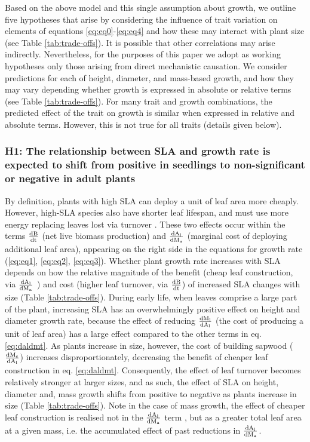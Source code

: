 \documentclass[a4paper,11pt]{article}
\begin{document}
Based on the above model and this single assumption about growth, we outline five hypotheses that arise by considering the influence of trait variation on elements of equations  \ref{eq:eq0}-\ref{eq:eq4} and how these may interact with plant size (see Table \ref{tab:trade-offs}). It is possible that other correlations may arise indirectly. Nevertheless, for the purposes of this paper we adopt as working hypotheses only those arising from direct mechanistic causation. We consider predictions for each of height, diameter, and mass-based growth, and how they  may vary depending whether growth is expressed in absolute or relative terms (see Table \ref{tab:trade-offs}). For many trait and growth combinations, the predicted effect of the trait on growth is similar when expressed in relative and absolute terms. However, this is not true for all traits (details given below).
\subsubsection*{H1: The relationship between SLA and growth rate is expected to shift from positive in seedlings to non-significant or negative in adult plants}

By definition, plants with high SLA can deploy a unit of leaf area more cheaply. However, high-SLA species also have shorter leaf lifespan, and must use more energy replacing leaves lost via turnover \citep{Wright:2004jb}. These two effects occur within the terms  $\frac{\rm{d} B}{\rm{d} t}$ (net live biomass production) and $\frac{\rm{d} A_{\rm l}}{\rm{d} M_{\rm a} }$ (marginal cost of deploying additional leaf area), appearing on the right side in the equations for growth rate (\ref{eq:eq1}, \ref{eq:eq2}, \ref{eq:eq3}). Whether plant growth rate increases with SLA depends on how the relative magnitude of the benefit (cheap leaf construction, via $\frac{\rm{d} A_{\rm l}}{\rm{d} M_{\rm a} }$ ) and cost (higher leaf turnover, via $\frac{\rm{d} B}{\rm{d} t}$) of increased SLA changes with size (Table \ref{tab:trade-offs}).
During early life, when leaves comprise a large part of the plant, increasing SLA has an overwhelmingly positive effect on height and diameter growth rate, because the effect of reducing $\frac{\rm{d} M_{\rm l}}{\rm{d} A_{\rm l}}$ (the cost of producing a unit of leaf area) has a large effect compared to the other terms in eq. \ref{eq:daldmt}. As plants increase in size, however, the cost of building sapwood ($\frac{\rm{d} M_{\rm s}}{\rm{d} A_{\rm l}}$) increases disproportionately, decreasing the benefit of cheaper leaf construction in eq.  \ref{eq:daldmt}. Consequently, the effect of leaf turnover becomes relatively stronger at larger sizes, and as such, the effect of SLA on height, diameter and, mass growth shifts from positive to negative as plants increase in size (Table \ref{tab:trade-offs}). Note in the case of mass growth, the effect of cheaper leaf construction is realised not in the $\frac{\rm{d} A_{\rm l}}{\rm{d} M_{\rm a} }$ term , but as a greater total leaf area at a given mass, i.e. the accumulated effect of past reductions in  $\frac{\rm{d} A_{\rm l}}{\rm{d} M_{\rm a} }$.
\end{document}
